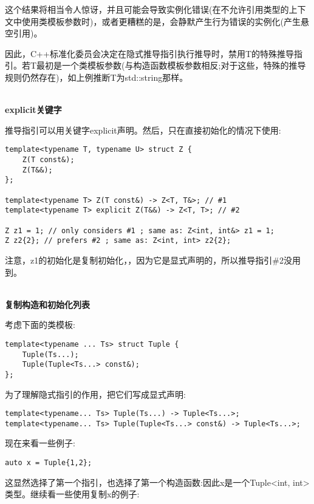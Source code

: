 这个结果将相当令人惊讶，并且可能会导致实例化错误(在不允许引用类型的上下文中使用类模板参数时)，或者更糟糕的是，会静默产生行为错误的实例化(产生悬空引用)。

因此，C++标准化委员会决定在隐式推导指引执行推导时，禁用T的特殊推导指引。若T最初是一个类模板参数(与构造函数模板参数相反;对于这些，特殊的推导规则仍然存在)，如上例推断T为std::string那样。


\hspace*{\fill} \\ %
\noindent
\textbf{explicit关键字}

推导指引可以用关键字explicit声明。然后，只在直接初始化的情况下使用:

\begin{lstlisting}[style=styleCXX]
template<typename T, typename U> struct Z {
	Z(T const&);
	Z(T&&);
};

template<typename T> Z(T const&) -> Z<T, T&>; // #1
template<typename T> explicit Z(T&&) -> Z<T, T>; // #2

Z z1 = 1; // only considers #1 ; same as: Z<int, int&> z1 = 1;
Z z2{2}; // prefers #2 ; same as: Z<int, int> z2{2};
\end{lstlisting}

注意，z1的初始化是复制初始化，，因为它是显式声明的，所以推导指引\#2没用到。

\hspace*{\fill} \\ %
\noindent
\textbf{复制构造和初始化列表}

考虑下面的类模板:

\begin{lstlisting}[style=styleCXX]
template<typename ... Ts> struct Tuple {
	Tuple(Ts...);
	Tuple(Tuple<Ts...> const&);
};
\end{lstlisting}

为了理解隐式指引的作用，把它们写成显式声明:

\begin{lstlisting}[style=styleCXX]
template<typename... Ts> Tuple(Ts...) -> Tuple<Ts...>;
template<typename... Ts> Tuple(Tuple<Ts...> const&) -> Tuple<Ts...>;
\end{lstlisting}

现在来看一些例子:

\begin{lstlisting}[style=styleCXX]
auto x = Tuple{1,2};
\end{lstlisting}

这显然选择了第一个指引，也选择了第一个构造函数:因此x是一个Tuple<int, int>类型。继续看一些使用复制x的例子:

